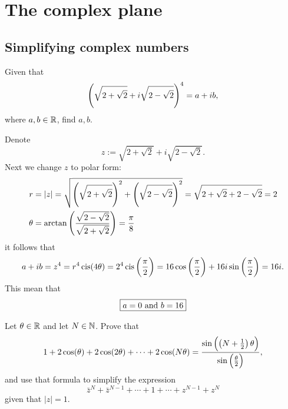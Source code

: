 \documentclass[11pt,a4paper]{article}
\begin{document}
\maketitle

\newpage
\tableofcontents
\newpage

\section{The complex plane}

\subsection{Simplifying complex numbers}

\begin{exercise}
  Given that
  \[
    \del{\sqrt{2 + \sqrt{2}} + i \sqrt{2 - \sqrt{2}}}^4 =
    a + i b,
  \]
  where $a,b \in \mathbb{R}$, find $a,b$.
\end{exercise}
\begin{solution}
  Denote
  \[
    z := \sqrt{2 + \sqrt{2}} + i \sqrt{2 - \sqrt{2}}.
  \]
  Next we change $z$ to polar form:
  \begin{align*}
    r &= |z| = 
    \sqrt{\del{\sqrt{2 + \sqrt{2}}}^2 + 
    \del{\sqrt{2 - \sqrt{2}}}^2} =
    \sqrt{2 + \sqrt{2} + 2 - \sqrt{2}} =
    2 \\
    \theta &= 
    \arctan\del{\frac{\sqrt{2 - \sqrt{2}}}{\sqrt{2 + \sqrt{2}}}} =
    \frac{\pi}{8}
  \end{align*}
  it follows that
  \[
    a + i b = z^4 = 
    r^4 \cis(4 \theta) =
    2^{4} \cis\del{\frac{\pi}{2}} =
    16 \cos\del{\frac{\pi}{2}} + 16 i \sin\del{\frac{\pi}{2}} =
    16 i.
  \]
  This mean that
  \[
    \boxed{a = 0 \text{ and } b = 16}
  \]
\end{solution}
\begin{exercise}
  Let $\theta \in \mathbb{R}$ and let $N \in \mathbb{N}$.
  Prove that
  \[
    1 + 2 \cos(\theta) + 2 \cos(2 \theta) + \cdots + 2 \cos(N \theta) =
    \frac{\sin\del{\del{N + \half} \theta}}{\sin\del{\frac{\theta}{2}}},
  \]
  and use that formula to simplify the expression
  \[
    \bar z^N + \bar z^{N - 1} + \cdots + 1 + \cdots + z^{N - 1} + z^N
  \]
  given that $|z| = 1$.
\end{exercise}
\end{document}
